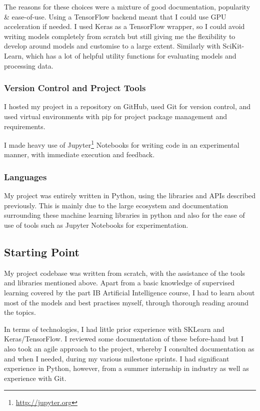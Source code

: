 \documentclass[12pt,a4paper,twoside]{report}
\begin{document}
The reasons for these choices were a mixture of good documentation, popularity \& ease-of-use. Using a TensorFlow backend meant that I could use GPU acceleration if needed. I used Keras as a TensorFlow wrapper, so I could avoid writing models completely from scratch but still giving me the flexibility to develop around models and customise to a large extent. Similarly with SciKit-Learn, which has a lot of helpful utility functions for evaluating models and processing data.

\subsubsection{Version Control and Project Tools}

I hosted my project in a repository on GitHub, used Git for version control, and used virtual environments with pip for project package management and requirements.

I made heavy use of Jupyter\footnote{\href{http://jupyter.org}{http://jupyter.org}} Notebooks for writing code in an experimental manner, with immediate execution and feedback. 


\subsubsection{Languages}

My project was entirely written in Python, using the libraries and APIs described previously. This is mainly due to the large ecosystem and documentation surrounding these machine learning libraries in python and also for the ease of use of tools such as Jupyter Notebooks for experimentation.

\subsection{Starting Point}

My project codebase was written from scratch, with the assistance of the tools and libraries mentioned above. Apart from a basic knowledge of supervised learning covered by the part IB Artificial Intelligence course, I had to learn about most of the models and best practises myself, through thorough reading around the topics. 


In terms of technologies, I had little prior experience with SKLearn and Keras/TensorFlow. I reviewed some documentation of these before-hand but I also took an agile approach to the project, whereby I consulted documentation as and when I needed, during my various milestone sprints. I had significant experience in Python, however, from a summer internship in industry as well as experience with Git.
\end{document}
